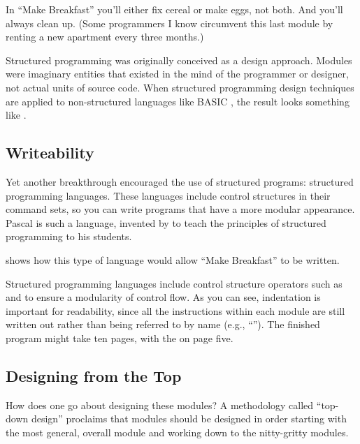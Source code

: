 In ``Make Breakfast'' you'll either fix cereal or make eggs, not
both. And you'll always clean up. (Some programmers I know circumvent
this last module by renting a new apartment every three months.)


Structured programming was originally conceived as a design approach.
Modules were imaginary entities that existed in the mind of the
programmer or designer, not actual units of source code. When
structured programming design techniques are applied to non-structured
languages like BASIC%
,
the result looks something like .


\subsection{Writeability}%
%
Yet another breakthrough encouraged the use of structured programs:
structured programming languages. These languages include control
structures in their command sets, so you can write programs that have
a more modular appearance. Pascal%
is such a language, invented by %
to teach the principles of structured programming to his students.


 shows how this type of language would
allow ``Make Breakfast'' to be written.

Structured programming languages include control structure operators
such as  and  to ensure a modularity of control
flow. As you can see, indentation is important for readability, since
all the instructions within each module are still written out rather
than being referred to by name (e.g., ``'').
The finished program might take ten pages, with the 
on page five.%
%
%


\subsection{Designing from the Top}%
%
How does one go about designing these modules? A methodology called
``top-down design'' proclaims that modules should be designed in order
starting with the most general, overall module and working down to the
nitty-gritty modules.

